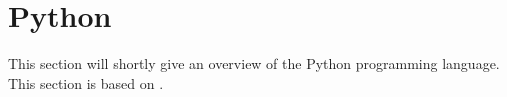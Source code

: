 \section{Python}
This section will shortly give an overview of the Python programming language.
This section is based on \citet{python_docs}.
